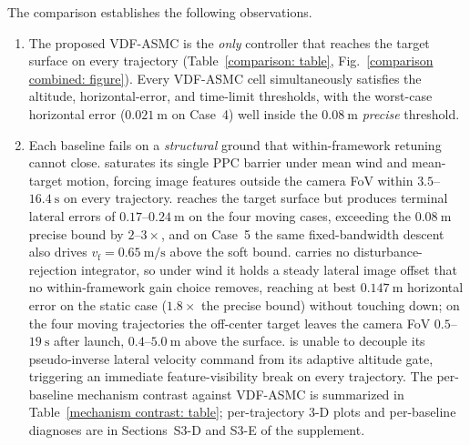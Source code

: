 The comparison establishes the following observations.
\begin{enumerate}
    \item The proposed VDF-ASMC is the \emph{only} controller that reaches the target surface on every trajectory (Table~\ref{comparison: table}, Fig.~\ref{comparison combined: figure}). Every VDF-ASMC cell simultaneously satisfies the altitude, horizontal-error, and time-limit thresholds, with the worst-case horizontal error ($0.021~\text{m}$ on Case~4) well inside the $0.08~\text{m}$ \emph{precise} threshold.
    \item Each baseline fails on a \emph{structural} ground that within-framework retuning cannot close. \cite{lin2022} saturates its single PPC barrier under mean wind and mean-target motion, forcing image features outside the camera FoV within $3.5$--$16.4~\text{s}$ on every trajectory. \cite{zhang2026} reaches the target surface but produces terminal lateral errors of $0.17$--$0.24~\text{m}$ on the four moving cases, exceeding the $0.08~\text{m}$ precise bound by $2$--$3\times$, and on Case~5 the same fixed-bandwidth descent also drives $v_\text{f}=0.65~\text{m/s}$ above the soft bound. \cite{lin2023} carries no disturbance-rejection integrator, so under wind it holds a steady lateral image offset that no within-framework gain choice removes, reaching at best $0.147~\text{m}$ horizontal error on the static case ($1.8\times$ the precise bound) without touching down; on the four moving trajectories the off-center target leaves the camera FoV $0.5$--$19~\text{s}$ after launch, $0.4$--$5.0~\text{m}$ above the surface. \cite{cho2022} is unable to decouple its pseudo-inverse lateral velocity command from its adaptive altitude gate, triggering an immediate feature-visibility break on every trajectory. The per-baseline mechanism contrast against VDF-ASMC is summarized in Table~\ref{mechanism contrast: table}; per-trajectory 3-D plots and per-baseline diagnoses are in Sections~S3-D and S3-E of the supplement.


\end{enumerate}
